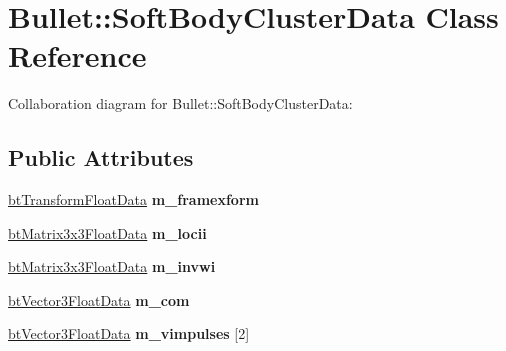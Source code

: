 \hypertarget{class_bullet_1_1_soft_body_cluster_data}{\section{Bullet\+:\+:Soft\+Body\+Cluster\+Data Class Reference}
\label{class_bullet_1_1_soft_body_cluster_data}
}


Collaboration diagram for Bullet\+:\+:Soft\+Body\+Cluster\+Data\+:
\subsection*{Public Attributes}
\begin{DoxyCompactItemize}
\item 
\hypertarget{class_bullet_1_1_soft_body_cluster_data_aa1d428386982e70a3cca3b93a1fe0d7a}{\hyperlink{class_bullet_1_1bt_transform_float_data}{bt\+Transform\+Float\+Data} {\bfseries m\+\_\+framexform}}\label{class_bullet_1_1_soft_body_cluster_data_aa1d428386982e70a3cca3b93a1fe0d7a}

\item 
\hypertarget{class_bullet_1_1_soft_body_cluster_data_a8741055d15d8fef2d130ab62d3cb7b21}{\hyperlink{class_bullet_1_1bt_matrix3x3_float_data}{bt\+Matrix3x3\+Float\+Data} {\bfseries m\+\_\+locii}}\label{class_bullet_1_1_soft_body_cluster_data_a8741055d15d8fef2d130ab62d3cb7b21}

\item 
\hypertarget{class_bullet_1_1_soft_body_cluster_data_a9e5cd2b4659117c3709b96a89067eace}{\hyperlink{class_bullet_1_1bt_matrix3x3_float_data}{bt\+Matrix3x3\+Float\+Data} {\bfseries m\+\_\+invwi}}\label{class_bullet_1_1_soft_body_cluster_data_a9e5cd2b4659117c3709b96a89067eace}

\item 
\hypertarget{class_bullet_1_1_soft_body_cluster_data_ae6fad2e2068195f6b92730eb5b43573b}{\hyperlink{class_bullet_1_1bt_vector3_float_data}{bt\+Vector3\+Float\+Data} {\bfseries m\+\_\+com}}\label{class_bullet_1_1_soft_body_cluster_data_ae6fad2e2068195f6b92730eb5b43573b}

\item 
\hypertarget{class_bullet_1_1_soft_body_cluster_data_af0a5c1a789967264d9a91f9810192a8a}{\hyperlink{class_bullet_1_1bt_vector3_float_data}{bt\+Vector3\+Float\+Data} {\bfseries m\+\_\+vimpulses} \mbox{[}2\mbox{]}}\label{class_bullet_1_1_soft_body_cluster_data_af0a5c1a789967264d9a91f9810192a8a}


\end{DoxyCompactItemize}

